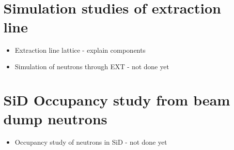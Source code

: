 \section{Simulation studies of extraction line}
\label{BeamDumps:sim_EXT}

\begin{itemize}
 \item Extraction line lattice - explain components
 \item Simulation of neutrons through EXT - not done yet
\end{itemize}

\section{SiD Occupancy study from beam dump neutrons}
\label{BeamDumps:SiDocc}

\begin{itemize}
 \item Occupancy study of neutrons in SiD - not done yet
\end{itemize}